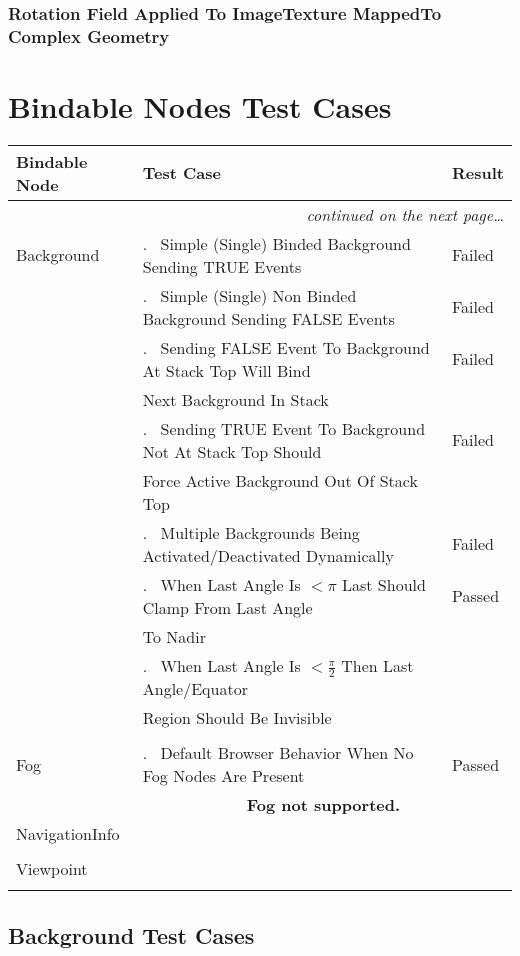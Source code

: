 \documentclass[12pt,letterpaper]{article}
\newcounter{testCaseCtr}
\newcommand{\testCase}{\arabic{testCaseCtr}.~ \stepcounter{testCaseCtr}}
\newcommand{\resetTestCase}{\setcounter{testCaseCtr}{1}}
\newcommand{\TTHa}{Rotation Field Applied To ImageTexture Mapped}
\newcommand{\TTHb}{To Complex Geometry}
\newcommand{\BkgA}{Simple (Single) Binded Background Sending TRUE Events}
\newcommand{\BkgB}{Simple (Single) Non Binded Background Sending FALSE Events}
\newcommand{\BkgCa}{Sending FALSE Event To Background At Stack Top Will Bind}
\newcommand{\BkgCb}{Next Background In Stack}
\newcommand{\BkgDa}{Sending TRUE Event To Background Not At Stack Top Should}
\newcommand{\BkgDb}{Force Active Background Out Of Stack Top}
\newcommand{\BkgE}{Multiple Backgrounds Being Activated/Deactivated Dynamically}
\newcommand{\BkgFa}{When Last Angle Is $ < \pi$ Last Should Clamp From Last Angle}
\newcommand{\BkgFb}{To Nadir}
\newcommand{\BkgGa}{When Last Angle Is $ < \frac{\pi}{2}$ Then Last Angle/Equator}
\newcommand{\BkgGb}{Region Should Be Invisible}
\newcommand{\FogA}{Default Browser Behavior When No Fog Nodes Are Present}
\begin{document}
\subsubsection{\TTHa \TTHb}

\section{Bindable Nodes Test Cases}
\resetTestCase

\begin{center}
\setlongtables
\begin{longtable}{|l|l|l|}
\hline
\textbf{Bindable Node} & \textbf{Test Case} & \textbf{Result} \\
\hline\hline
\endhead
 & \multicolumn{2}{|r|}{\textsl{continued on the next page\ldots}} \\
\hline
\endfoot
\hline
\endlastfoot
Background & \testCase \BkgA & Failed \\\cline{2-3}
 & \testCase \BkgB & Failed \\\cline{2-3}
 & \testCase \BkgCa & Failed \\
 & \BkgCb & \\\cline{2-3}
 & \testCase \BkgDa & Failed \\
 & \BkgDb & \\\cline{2-3}
 & \testCase \BkgE & Failed \\\cline{2-3}
 & \testCase \BkgFa & Passed \\
 & \BkgFb & \\\cline{2-3}
 & \testCase \BkgGa & \\
 & \BkgGb & \\\cline{2-3}
 & & \\\hline
\resetTestCase
Fog & \testCase \FogA & Passed \\\cline{2-3}
 & \multicolumn{2}{|c|}{\textbf{Fog not supported.}} \\\hline
\resetTestCase
NavigationInfo & & \\\cline{2-3}
 & & \\\hline
\resetTestCase
Viewpoint & & \\\cline{2-3}
 & & \\
\end{longtable}
\end{center}

\subsection{Background Test Cases}
\end{document}
